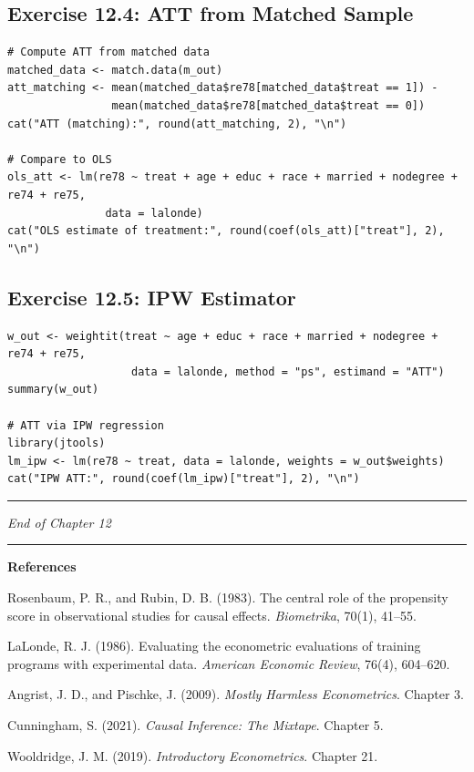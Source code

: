 \subsection{Exercise 12.4: ATT from Matched Sample}

\begin{lstlisting}
# Compute ATT from matched data
matched_data <- match.data(m_out)
att_matching <- mean(matched_data$re78[matched_data$treat == 1]) -
                mean(matched_data$re78[matched_data$treat == 0])
cat("ATT (matching):", round(att_matching, 2), "\n")

# Compare to OLS
ols_att <- lm(re78 ~ treat + age + educ + race + married + nodegree + re74 + re75,
               data = lalonde)
cat("OLS estimate of treatment:", round(coef(ols_att)["treat"], 2), "\n")
\end{lstlisting}

\subsection{Exercise 12.5: IPW Estimator}

\begin{lstlisting}
w_out <- weightit(treat ~ age + educ + race + married + nodegree + re74 + re75,
                   data = lalonde, method = "ps", estimand = "ATT")
summary(w_out)

# ATT via IPW regression
library(jtools)
lm_ipw <- lm(re78 ~ treat, data = lalonde, weights = w_out$weights)
cat("IPW ATT:", round(coef(lm_ipw)["treat"], 2), "\n")
\end{lstlisting}

\medskip\hrule\medskip

\textit{End of Chapter 12}

\medskip\hrule\medskip

\textbf{References}

Rosenbaum, P. R., and Rubin, D. B. (1983). The central role of the propensity score in observational studies for causal effects. \textit{Biometrika}, 70(1), 41--55.

LaLonde, R. J. (1986). Evaluating the econometric evaluations of training programs with experimental data. \textit{American Economic Review}, 76(4), 604--620.

Angrist, J. D., and Pischke, J. (2009). \textit{Mostly Harmless Econometrics}. Chapter 3.

Cunningham, S. (2021). \textit{Causal Inference: The Mixtape}. Chapter 5.

Wooldridge, J. M. (2019). \textit{Introductory Econometrics}. Chapter 21.
